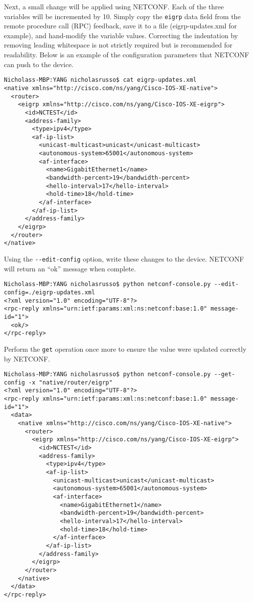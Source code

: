 Next, a small change will be applied using NETCONF. Each of the three
variables will be incremented by 10. Simply copy the \verb|eigrp| data field from
the remote procedure call (RPC) feedback, save it to a file (eigrp-updates.xml
for example), and hand-modify the variable values. Correcting the indentation
by removing leading whitespace is not strictly required but is recommended for
readability. Below is an example of the configuration parameters that NETCONF
can push to the device.

\begin{verbatim}
Nicholass-MBP:YANG nicholasrusso$ cat eigrp-updates.xml
<native xmlns="http://cisco.com/ns/yang/Cisco-IOS-XE-native">
  <router>
    <eigrp xmlns="http://cisco.com/ns/yang/Cisco-IOS-XE-eigrp">
      <id>NCTEST</id>
      <address-family>
        <type>ipv4</type>
        <af-ip-list>
          <unicast-multicast>unicast</unicast-multicast>
          <autonomous-system>65001</autonomous-system>
          <af-interface>
            <name>GigabitEthernet1</name>
            <bandwidth-percent>19</bandwidth-percent>
            <hello-interval>17</hello-interval>
            <hold-time>18</hold-time>
          </af-interface>
        </af-ip-list>
      </address-family>
    </eigrp>
  </router>
</native>
\end{verbatim}

Using the \verb|--edit-config| option, write these changes to the device. NETCONF
will return an ``ok'' message when complete.

\begin{verbatim}
Nicholass-MBP:YANG nicholasrusso$ python netconf-console.py --edit-config=./eigrp-updates.xml
<?xml version="1.0" encoding="UTF-8"?>
<rpc-reply xmlns="urn:ietf:params:xml:ns:netconf:base:1.0" message-id="1">
  <ok/>
</rpc-reply>
\end{verbatim}

Perform the \verb|get| operation once more to ensure the value were updated correctly by NETCONF.
 
\begin{verbatim}
Nicholass-MBP:YANG nicholasrusso$ python netconf-console.py --get-config -x "native/router/eigrp"
<?xml version="1.0" encoding="UTF-8"?>
<rpc-reply xmlns="urn:ietf:params:xml:ns:netconf:base:1.0" message-id="1">
  <data>
    <native xmlns="http://cisco.com/ns/yang/Cisco-IOS-XE-native">
      <router>
        <eigrp xmlns="http://cisco.com/ns/yang/Cisco-IOS-XE-eigrp">
          <id>NCTEST</id>
          <address-family>
            <type>ipv4</type>
            <af-ip-list>
              <unicast-multicast>unicast</unicast-multicast>
              <autonomous-system>65001</autonomous-system>
              <af-interface>
                <name>GigabitEthernet1</name>
                <bandwidth-percent>19</bandwidth-percent>
                <hello-interval>17</hello-interval>
                <hold-time>18</hold-time>
              </af-interface>
            </af-ip-list>
          </address-family>
        </eigrp>
      </router>
    </native>
  </data>
</rpc-reply>
\end{verbatim}

